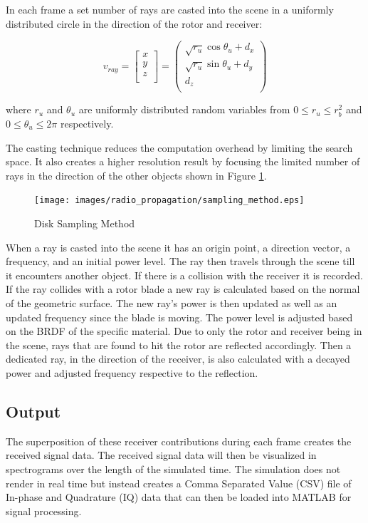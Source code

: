 In each frame a set number of rays are casted into the scene in a uniformly distributed circle in the direction of the rotor and receiver:

\begin{equation}
	v_{ray} = \begin{bmatrix}
			x \\
			y \\
			z \\
	\end{bmatrix}
	= \begin{pmatrix}
			\sqrt{r_u} \cos{\theta_u}  + d_x\\
			\sqrt{r_u} \sin{\theta_u}  + d_y \\
			d_z \\
	\end{pmatrix}
	\label{eqn:disk}
\end{equation}

where $r_u$ and $\theta_u$ are uniformly distributed random variables from $0 \leq r_u \leq r_b^{2}$ and $ 0 \leq \theta_u \leq 2\pi$ respectively.

The casting technique reduces the computation overhead by limiting the search space. It also creates a higher resolution result by focusing the limited number of rays in the direction of the other objects shown in Figure \ref{fig:samp_method}.

\begin{figure}
	\begin{center}
		\texttt{[image: images/radio\_propagation/sampling\_method.eps]}
		\caption{Disk Sampling Method}
		\label{fig:samp_method}
	\end{center}
\end{figure}

When a ray is casted into the scene it has an origin point, a direction vector, a frequency, and an initial power level. The ray then travels through the scene till it encounters another object. If there is a collision with the receiver it is recorded. If the ray collides with a rotor blade a new ray is calculated based on the normal of the geometric surface. The new ray's power is then updated as well as an updated frequency since the blade is moving. The power level is adjusted based on the BRDF of the specific material. Due to only the rotor and receiver being in the scene, rays that are found to hit the rotor are reflected accordingly. Then a dedicated ray, in the direction of the receiver, is also calculated with a decayed power and adjusted frequency respective to the reflection.

\subsection{Output}
The superposition of these receiver contributions during each frame creates the received signal data. The received signal data will then be visualized in spectrograms over the length of the simulated time. The simulation does not render in real time but instead creates a Comma Separated Value (CSV) file of In-phase and Quadrature (IQ) data that can then be loaded into MATLAB for signal processing.




